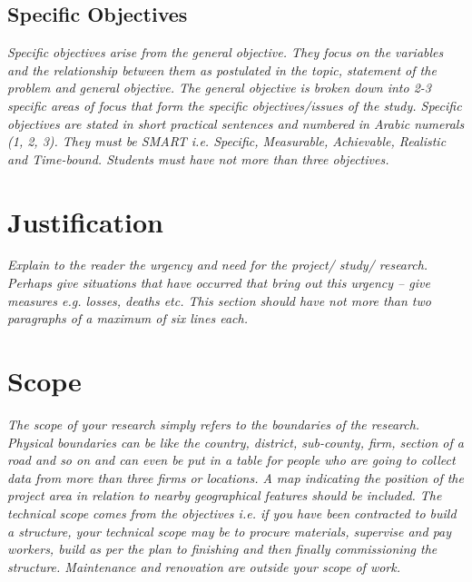 \subsection{Specific Objectives}
\emph{Specific objectives arise from the general objective.
	They focus on the variables and the relationship between them as postulated in the topic, statement of the problem and general objective.
	The general objective is broken down into 2-3 specific areas of focus that form the specific objectives/issues of the study.
	Specific objectives are stated in short practical sentences and numbered in Arabic numerals (1, 2, 3).
	They must be SMART i.e. Specific, Measurable, Achievable, Realistic and Time-bound.
	Students must have not more than three objectives.}

\section{Justification}
\emph{Explain to the reader the urgency and need for the project/ study/ research.
	Perhaps give situations that have occurred that bring out this urgency – give measures e.g. losses, deaths etc.
	This section should have not more than two paragraphs of a maximum of six lines each.}

\section{Scope}
\emph{The scope of your research simply refers to the boundaries of the research.
	Physical boundaries can be like the country, district, sub-county, firm, section of a road and so on and can even be put in a table for people who are going to collect data from more than three firms or locations.
	A map indicating the position of the project area in relation to nearby geographical features should be included.
	The technical scope comes from the objectives i.e. if you have been contracted to build a structure, your technical scope may be to procure materials, supervise and pay workers, build as per the plan to finishing and then finally commissioning the structure.
	Maintenance and renovation are outside your scope of work.}

